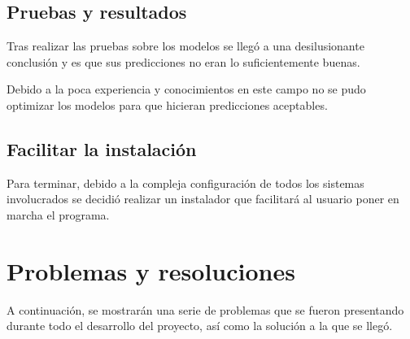 \subsection{Pruebas y resultados}

Tras realizar las pruebas sobre los modelos se llegó a una desilusionante conclusión y es que sus predicciones no eran lo suficientemente buenas.

Debido a la poca experiencia y conocimientos en este campo no se pudo optimizar los modelos para que hicieran predicciones aceptables.

\subsection{Facilitar la instalación}
Para terminar, debido a la compleja configuración de todos los sistemas involucrados se decidió realizar un instalador que facilitará al usuario poner en marcha el programa.

\section{Problemas y resoluciones}\label{cap:Problemas}
A continuación, se mostrarán una serie de problemas que se fueron presentando durante todo el desarrollo del proyecto, así como la solución a la que se llegó.

